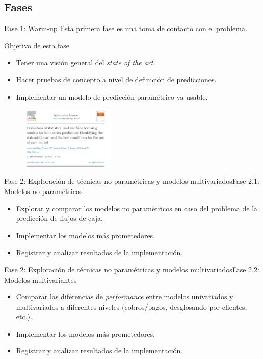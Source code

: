 \documentclass[12pt, aspectratio=169]{beamer} %
\begin{document}
\subsection{Fases}

\begin{frame}{Fase 1: Warm-up}
  Esta primera fase es una toma de contacto con el problema.

  \begin{block}{Objetivo de esta fase}
    \begin{itemize}
    \item Tener una visión general del \textit{state of the art}.
    \item Hacer pruebas de concepto a nivel de definición de predicciones.
    \item Implementar un modelo de predicción paramétrico ya usable.
    \end{itemize}
  \end{block}

  \begin{figure}
    \includegraphics[width=0.4\textwidth]{20210413_1_evaluation_shapshot.png}
    \label{fig:evalutaion}
  \end{figure}

\end{frame}

\begin{frame}{Fase 2: Exploración de técnicas no paramétricas y modelos multivariados}{Fase 2.1: Modelos no paramétricos}
  \begin{itemize}
  \item Explorar y comparar los modelos no paramétricos en caso del problema de la predicción de flujos de caja.
  \item Implementar los modelos más prometedores.
  \item Registrar y analizar resultados de la implementación. 
  \end{itemize}
\end{frame}

\begin{frame}{Fase 2: Exploración de técnicas no paramétricas y modelos multivariados}{Fase 2.2: Modelos multivariantes}

    \begin{itemize}
    \item Comparar las diferencias de \textit{performance} entre modelos univariados y multivariados a diferentes niveles (cobros/pagos, desglosando por clientes, etc.).
    \item Implementar los modelos más prometedores.
    \item Registrar y analizar resultados de la implementación. 
    \end{itemize}


\end{frame}
\end{document}
